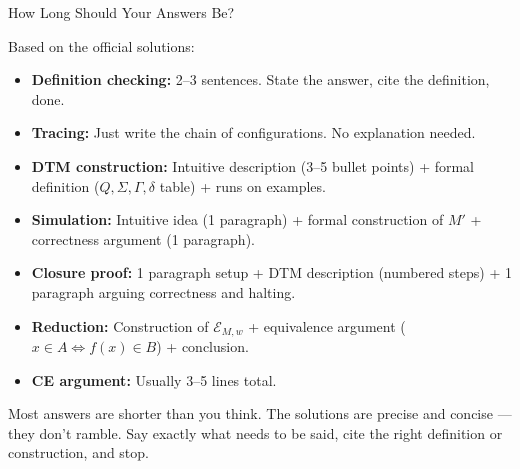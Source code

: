 \documentclass[11pt,a4paper]{article}
\newcommand{\keytakeaway}[1]{%
  \par\vspace{0.3em}%
  \colorbox{yellow!60}{\parbox{\dimexpr\linewidth-2\fboxsep}{#1}}%
  \vspace{0.3em}}
\begin{document}
\begin{conceptbox}{How Long Should Your Answers Be?}

Based on the official solutions:

\begin{itemize}
    \item \textbf{Definition checking:} 2--3 sentences. State the answer, cite the definition, done.
    \item \textbf{Tracing:} Just write the chain of configurations. No explanation needed.
    \item \textbf{DTM construction:} Intuitive description (3--5 bullet points) + formal definition ($Q, \Sigma, \Gamma, \delta$ table) + runs on examples.
    \item \textbf{Simulation:} Intuitive idea (1 paragraph) + formal construction of $M'$ + correctness argument (1 paragraph).
    \item \textbf{Closure proof:} 1 paragraph setup + DTM description (numbered steps) + 1 paragraph arguing correctness and halting.
    \item \textbf{Reduction:} Construction of $\mathcal{E}_{M,w}$ + equivalence argument ($x \in A \iff f(x) \in B$) + conclusion.
    \item \textbf{CE argument:} Usually 3--5 lines total.
\end{itemize}

\keytakeaway{Most answers are shorter than you think. The solutions are precise and concise --- they don't ramble. Say exactly what needs to be said, cite the right definition or construction, and stop.}
\end{conceptbox}
\end{document}
